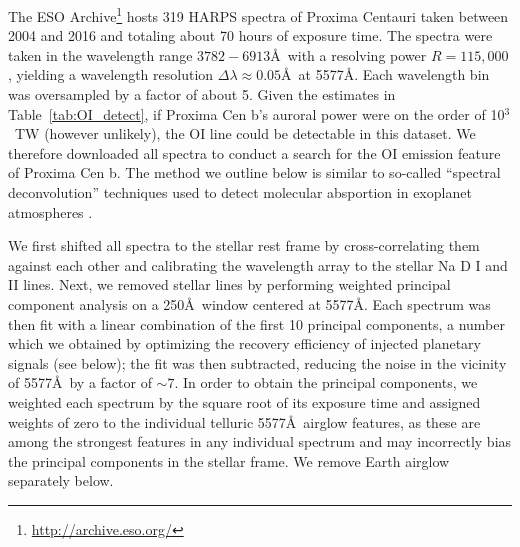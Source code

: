 \documentclass{emulateapj}
\begin{document}
The ESO Archive\footnote{\url{http://archive.eso.org/}} hosts 319 HARPS spectra of Proxima Centauri taken between 2004 and 2016 and totaling about 70 hours of exposure time. The spectra were taken in the wavelength range $3782-6913$\AA\ with a resolving power $R = 115,000$, yielding a wavelength resolution $\Delta\lambda \approx 0.05$\AA\ at 5577\AA. Each wavelength bin was oversampled by a factor of about 5. Given the estimates in Table~\ref{tab:OI_detect}, if Proxima Cen b's auroral power were on the order of 10$^{3}$~TW (however unlikely), the OI line could be detectable in this dataset. We therefore downloaded all spectra to conduct a search for the OI emission feature of Proxima Cen b. The method we outline below is similar to so-called ``spectral deconvolution'' techniques used to detect molecular absportion in exoplanet atmospheres \citep[e.g.,][]{SparksFord2002,RiaudSchneider2007,Kawahara2014,Snellen2015}.

We first shifted all spectra to the stellar rest frame by cross-correlating them against each other and calibrating the wavelength array to the stellar Na D I and II lines. Next, we removed stellar lines by performing weighted principal component analysis \citep[WPCA;][]{Delchambre2015} on a 250\AA\ window centered at 5577\AA. Each spectrum was then fit with a linear combination of the first 10 principal components, a number which we obtained by optimizing the recovery efficiency of injected planetary signals (see below); the fit was then subtracted, reducing the noise in the vicinity of 5577\AA\ by a factor of ${\sim} 7$. In order to obtain the principal components, we weighted each spectrum by the square root of its exposure time and assigned weights of zero to the individual telluric 5577\AA\ airglow features, as these are among the strongest features in any individual spectrum and may incorrectly bias the principal components in the stellar frame. We remove Earth airglow separately below.
\end{document}
